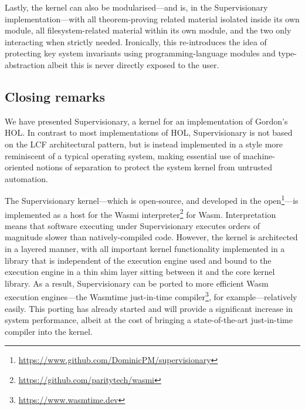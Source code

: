 \documentclass[a4paper, UKenglish, cleveref, autoref, thm-restate, colorlinks]{lipics-v2021}
\begin{document}
Lastly, the kernel can also be modularised---and is, in the Supervisionary implementation---with all theorem-proving related material isolated inside its own module, all filesystem-related material within its own module, and the two only interacting when strictly needed.
Ironically, this re-introduces the idea of protecting key system invariants using programming-language modules and type-abstraction albeit this is never directly exposed to the user.

\subsection{Closing remarks}

We have presented Supervisionary, a kernel for an implementation of Gordon's HOL.
In contrast to most implementations of HOL, Supervisionary is not based on the LCF architectural pattern, but is instead implemented in a style more reminiscent of a typical operating system, making essential use of machine-oriented notions of separation to protect the system kernel from untrusted automation.

The Supervisionary kernel---which is open-source, and developed in the open\footnote{\url{https://www.github.com/DominicPM/supervisionary}}---is implemented as a host for the Wasmi interpreter\footnote{\url{https://github.com/paritytech/wasmi}} for Wasm.
Interpretation means that software executing under Supervisionary executes orders of magnitude slower than natively-compiled code.
However, the kernel is architected in a layered manner, with all important kernel functionality implemented in a library that is independent of the execution engine used and bound to the execution engine in a thin shim layer sitting between it and the core kernel library.
As a result, Supervisionary can be ported to more efficient Wasm execution engines---the Wasmtime just-in-time compiler\footnote{\url{https://www.wasmtime.dev}}, for example---relatively easily.
This porting has already started and will provide a significant increase in system performance, albeit at the cost of bringing a state-of-the-art just-in-time compiler into the kernel.
\end{document}
